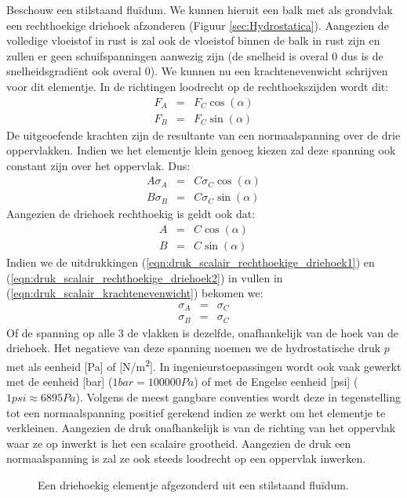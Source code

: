 Beschouw een stilstaand fluïdum. We kunnen hieruit een balk met als grondvlak een rechthoekige driehoek afzonderen (Figuur \ref{sec:Hydrostatica}). Aangezien de volledige vloeistof in rust is zal ook de vloeistof binnen de balk in rust zijn en zullen er geen schuifspanningen aanwezig zijn (de snelheid is overal 0 dus is de snelheidsgradiënt ook overal 0). We kunnen nu een krachtenevenwicht schrijven voor dit elementje. In de richtingen loodrecht op de rechthoekszijden wordt dit:
\begin{eqnarray}
	F_A &=& F_C \cos(\alpha) \\
	F_B &=& F_C \sin(\alpha)
\end{eqnarray}
De uitgeoefende krachten zijn de resultante van een normaalspanning over de drie oppervlakken. Indien we het elementje klein genoeg kiezen zal deze spanning ook constant zijn over het oppervlak. Dus:
\begin{eqnarray}
	A \sigma_A &=& C \sigma_C \cos(\alpha) \\
	B \sigma_B &=& C \sigma_C \sin(\alpha)
	\label{eqn:druk_scalair_krachtenevenwicht}
\end{eqnarray}
Aangezien de driehoek rechthoekig is geldt ook dat:
\begin{eqnarray}
	A &=& C \cos(\alpha) 
	\label{eqn:druk_scalair_rechthoekige_driehoek1} \\
	B &=& C \sin(\alpha)
	\label{eqn:druk_scalair_rechthoekige_driehoek2}
\end{eqnarray}
Indien we de uitdrukkingen (\ref{eqn:druk_scalair_rechthoekige_driehoek1}) en (\ref{eqn:druk_scalair_rechthoekige_driehoek2}) in vullen in (\ref{eqn:druk_scalair_krachtenevenwicht}) bekomen we:
\begin{eqnarray}
	\sigma_A &=& \sigma_C \\
	\sigma_B &=& \sigma_C
	\label{eqn:druk_scalair}
\end{eqnarray}
Of de spanning op alle 3 de vlakken is dezelfde, onafhankelijk van de hoek van de driehoek. Het negatieve van deze spanning noemen we de hydrostatische druk $p$ met als eenheid [Pa] of [\unit{N/m^2}]. In ingenieurstoepassingen wordt ook vaak gewerkt met de eenheid [bar] ($1\unit{bar} = 100000\unit{Pa}$) of met de Engelse eenheid [psi] ($1\unit{psi} \approx 6895\unit{Pa}$). Volgens de meest gangbare conventies wordt deze in tegenstelling tot een normaalspanning positief gerekend indien ze werkt om het elementje te verkleinen. Aangezien de druk onafhankelijk is van de richting van het oppervlak waar ze op inwerkt is het een scalaire grootheid. Aangezien de druk een normaalspanning is zal ze ook steeds loodrecht op een oppervlak inwerken.
\begin{figure}[htb]
	\centering
	
	\caption{Een driehoekig elementje afgezonderd uit een stilstaand fluïdum.}
	\label{fig:driehoek_uit_stilstaande_vloeistof}
\end{figure}

